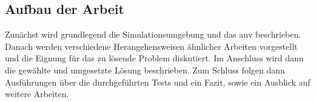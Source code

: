 \subsection{Aufbau der Arbeit}
Zunächst wird grundlegend die Simulationsumgebung und das \gls{auv} beschrieben. Danach werden verschiedene Herangehensweisen ähnlicher Arbeiten vorgestellt und die Eignung für das zu lösende Problem diskutiert.
Im Anschluss wird dann die gewählte und umgesetzte Lösung beschrieben. Zum Schluss folgen dann Ausführungen über die durchgeführten Tests und ein Fazit, sowie ein Ausblick auf weitere Arbeiten.
\afterpage{\null\newpage}